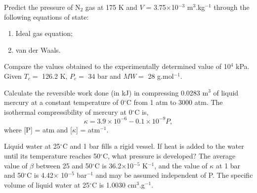 %
  \begin{probsol}\label{Chapter:VolumetricPropertiesPureSubstances:Problem:02}\citep{Cengel_Book} %
     Predict the pressure of N$_{2}$ gas at 175 K and $V$ = 3.75$\times$10$^{-3}$ m$^{3}$.kg$^{-1}$ through the following equations of state:
        \begin{enumerate}
          \item Ideal gas equation;
          \item van der Waals.
        \end{enumerate} 
     Compare the values obtained to the experimentally determined value of 10$^{4}$ kPa. Given $T_{c}=$ 126.2 K, $P_{c}=$ 34 bar and $MW=$ 28 g.mol$^{-1}$.
  \end{probsol}
%
  \begin{probsol}\label{Chapter:VolumetricPropertiesPureSubstances:Problem:03}\citep{SmithVanNess_Book} %
     Calculate the reversible work done (in kJ) in compressing 0.0283 m$^{3}$ of liquid mercury at a constant temperature of  0$^{\circ}$C from 1 atm to 3000 atm. The isothermal compressibility of mercury at 0$^{\circ}$C is,
     \begin{displaymath}
          \kappa = 3.9\times10^{-6} - 0.1\times 10^{-9}P,
     \end{displaymath}
where [P] = atm and [$\kappa$] = atm$^{-1}$.
  \end{probsol}
%
  \begin{probsol}\label{Chapter:VolumetricPropertiesPureSubstances:Problem:04} 
     Liquid water at 25$^{\circ}$C and 1 bar fills a rigid vessel. If heat is added to the water until its temperature reaches 50$^{\circ}$C, what pressure is developed? The average value of $\beta$ between 25 and 50$^{\circ}$C is 36.2$\times$10$^{-5}$ K$^{-1}$, and the value of $\kappa$ at 1 bar and 50$^{\circ}$C is 4.42$\times$ 10$^{-5}$ bar$^{-1}$  and may be assumed independent of P. The specific volume of liquid water at 25$^{\circ}$C  is 1.0030 cm$^{3}$.g$^{-1}$.
  \end{probsol}
%
